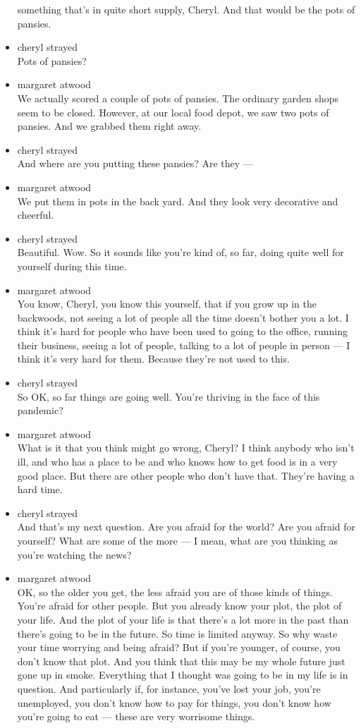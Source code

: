 \begin{itemize}
  something that's in quite short supply, Cheryl. And that would be the
  pots of pansies.
\item
  cheryl strayed\\
  Pots of pansies?
\item
  margaret atwood\\
  We actually scored a couple of pots of pansies. The ordinary garden
  shops seem to be closed. However, at our local food depot, we saw two
  pots of pansies. And we grabbed them right away.
\item
  cheryl strayed\\
  And where are you putting these pansies? Are they ---
\item
  margaret atwood\\
  We put them in pots in the back yard. And they look very decorative
  and cheerful.
\item
  cheryl strayed\\
  Beautiful. Wow. So it sounds like you're kind of, so far, doing quite
  well for yourself during this time.
\item
  margaret atwood\\
  You know, Cheryl, you know this yourself, that if you grow up in the
  backwoods, not seeing a lot of people all the time doesn't bother you
  a lot. I think it's hard for people who have been used to going to the
  office, running their business, seeing a lot of people, talking to a
  lot of people in person --- I think it's very hard for them. Because
  they're not used to this.
\item
  cheryl strayed\\
  So OK, so far things are going well. You're thriving in the face of
  this pandemic?
\item
  margaret atwood\\
  What is it that you think might go wrong, Cheryl? I think anybody who
  isn't ill, and who has a place to be and who knows how to get food is
  in a very good place. But there are other people who don't have that.
  They're having a hard time.
\item
  cheryl strayed\\
  And that's my next question. Are you afraid for the world? Are you
  afraid for yourself? What are some of the more --- I mean, what are
  you thinking as you're watching the news?
\item
  margaret atwood\\
  OK, so the older you get, the less afraid you are of those kinds of
  things. You're afraid for other people. But you already know your
  plot, the plot of your life. And the plot of your life is that there's
  a lot more in the past than there's going to be in the future. So time
  is limited anyway. So why waste your time worrying and being afraid?
  But if you're younger, of course, you don't know that plot. And you
  think that this may be my whole future just gone up in smoke.
  Everything that I thought was going to be in my life is in question.
  And particularly if, for instance, you've lost your job, you're
  unemployed, you don't know how to pay for things, you don't know how
  you're going to eat --- these are very worrisome things.


\end{itemize}
